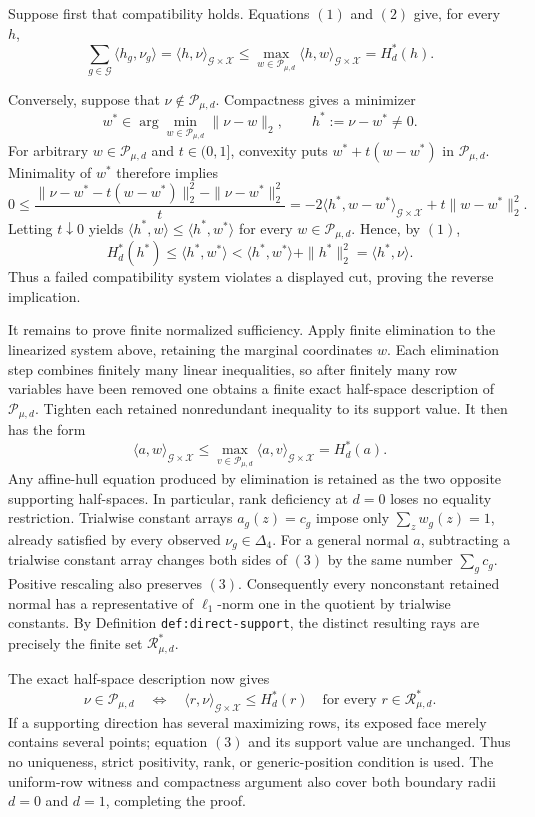 Suppose first that compatibility holds.  Equations \((1)\) and \((2)\) give, for every \(h\),
\[
 \sum_{g\in\mathcal G}\langle h_g,\nu_g\rangle
 =\langle h,\nu\rangle_{\mathcal G\times\mathcal X}
 \le \max_{w\in\mathcal P_{\mu,d}}\langle h,w\rangle_{\mathcal G\times\mathcal X}
 =H_d^*(h).
\]

Conversely, suppose that \(\nu\notin\mathcal P_{\mu,d}\).  Compactness gives a minimizer
\[
 w^*\in\arg\min_{w\in\mathcal P_{\mu,d}}\|\nu-w\|_2,
 \qquad h^*:=\nu-w^*\ne0.
\]
For arbitrary \(w\in\mathcal P_{\mu,d}\) and \(t\in(0,1]\), convexity puts
\(w^*+t(w-w^*)\) in \(\mathcal P_{\mu,d}\).  Minimality of \(w^*\) therefore implies
\[
 0\le
 \frac{\|\nu-w^*-t(w-w^*)\|_2^2-\|\nu-w^*\|_2^2}{t}
 =-2\langle h^*,w-w^*\rangle_{\mathcal G\times\mathcal X}
   +t\|w-w^*\|_2^2.
\]
Letting \(t\downarrow0\) yields
\(\langle h^*,w\rangle\le\langle h^*,w^*\rangle\) for every \(w\in\mathcal P_{\mu,d}\).  Hence, by \((1)\),
\[
 H_d^*(h^*)\le\langle h^*,w^*\rangle
 <\langle h^*,w^*\rangle+\|h^*\|_2^2
 =\langle h^*,\nu\rangle.
\]
Thus a failed compatibility system violates a displayed cut, proving the reverse implication.

It remains to prove finite normalized sufficiency.  Apply finite elimination to the linearized system above, retaining the marginal coordinates \(w\).  Each elimination step combines finitely many linear inequalities, so after finitely many row variables have been removed one obtains a finite exact half-space description of \(\mathcal P_{\mu,d}\).  Tighten each retained nonredundant inequality to its support value.  It then has the form
\[
 \langle a,w\rangle_{\mathcal G\times\mathcal X}\le
 \max_{v\in\mathcal P_{\mu,d}}\langle a,v\rangle_{\mathcal G\times\mathcal X}
 =H_d^*(a).
 \tag{3}
\]
Any affine-hull equation produced by elimination is retained as the two opposite supporting half-spaces.  In particular, rank deficiency at \(d=0\) loses no equality restriction.  Trialwise constant arrays \(a_g(z)=c_g\) impose only
\(\sum_z w_g(z)=1\), already satisfied by every observed \(\nu_g\in\Delta_4\).  For a general normal \(a\), subtracting a trialwise constant array changes both sides of \((3)\) by the same number \(\sum_g c_g\).  Positive rescaling also preserves \((3)\).  Consequently every nonconstant retained normal has a representative of \(\ell_1\)-norm one in the quotient by trialwise constants.  By Definition \texttt{def:direct-support}, the distinct resulting rays are precisely the finite set \(\mathcal R_{\mu,d}^*\).

The exact half-space description now gives
\[
 \nu\in\mathcal P_{\mu,d}
 \quad\Longleftrightarrow\quad
 \langle r,\nu\rangle_{\mathcal G\times\mathcal X}\le H_d^*(r)
 \quad\text{for every }r\in\mathcal R_{\mu,d}^*.
\]
If a supporting direction has several maximizing rows, its exposed face merely contains several points; equation \((3)\) and its support value are unchanged.  Thus no uniqueness, strict positivity, rank, or generic-position condition is used.  The uniform-row witness and compactness argument also cover both boundary radii \(d=0\) and \(d=1\), completing the proof.